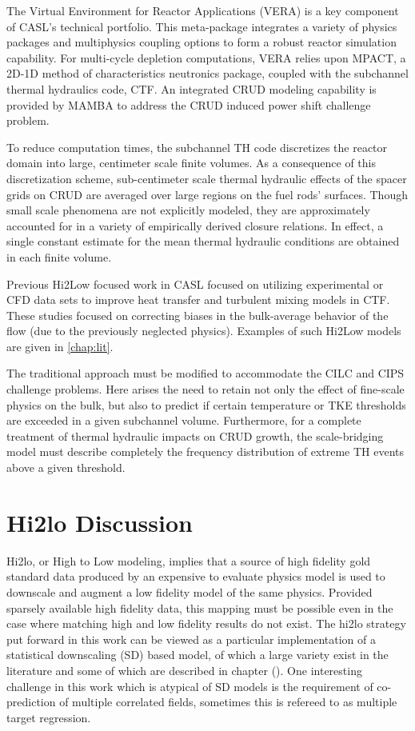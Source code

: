 The Virtual Environment for Reactor Applications (VERA) is a key component of
CASL's technical portfolio.  This meta-package integrates a variety of physics
packages and multiphysics coupling options to form a robust reactor simulation
capability.  For multi-cycle depletion computations, VERA relies upon MPACT, a
2D-1D method of characteristics neutronics package, coupled with the subchannel
thermal hydraulics code, CTF.  An integrated CRUD modeling capability
is provided by MAMBA to address the CRUD induced power shift challenge problem.

To reduce computation times, the subchannel TH code discretizes the reactor
domain into large, centimeter scale finite volumes. As a consequence of this
discretization scheme, sub-centimeter scale thermal hydraulic effects of the
spacer grids on CRUD are averaged over large regions on the fuel rods'
surfaces.  Though small scale phenomena are not explicitly modeled, they are
approximately accounted for in a variety of empirically derived closure
relations.  In effect, a single constant estimate for the mean thermal
hydraulic conditions are obtained in each finite volume.

Previous Hi2Low focused work in CASL focused on utilizing experimental or CFD
data sets to improve heat transfer and turbulent mixing models in CTF.  These studies focused on
correcting biases in the bulk-average behavior of the flow (due to the
previously neglected physics).  Examples of such Hi2Low models are given in
\autoref{chap:lit}.

The traditional approach must be modified to accommodate the CILC and CIPS
challenge problems.  Here arises the need to retain not only the effect of
fine-scale physics on the bulk, but also to predict if certain temperature or
TKE thresholds are exceeded in a given subchannel volume.  Furthermore, for a
complete treatment of thermal hydraulic impacts on CRUD growth, the
scale-bridging model must describe completely the frequency distribution of
extreme TH events above a given threshold.


\section{Hi2lo Discussion}

Hi2lo, or High to Low modeling, implies that a source of high fidelity gold standard data produced by an expensive to evaluate physics model is used to downscale and augment a low fidelity model of the same physics.
Provided sparsely available high fidelity data, this mapping must be possible even in the case where matching high and low fidelity results do not exist.  The hi2lo strategy put forward in this work can be viewed as a particular implementation of a statistical downscaling (SD) based model, of which a large variety exist in the literature and some of which are described in chapter ().  One interesting challenge in this work which is atypical of SD models is the requirement of co-prediction of multiple correlated fields, sometimes this is refereed to as multiple target regression.

